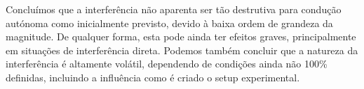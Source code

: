 Concluímos que a interferência não aparenta ser tão destrutiva para condução autónoma como inicialmente previsto, devido à baixa ordem de grandeza da magnitude. De qualquer forma, esta pode ainda ter efeitos graves, principalmente em situações de interferência direta. Podemos também concluir que a natureza da interferência é altamente volátil, dependendo de condições ainda não 100\% definidas, incluindo a influência como é criado o setup experimental.


